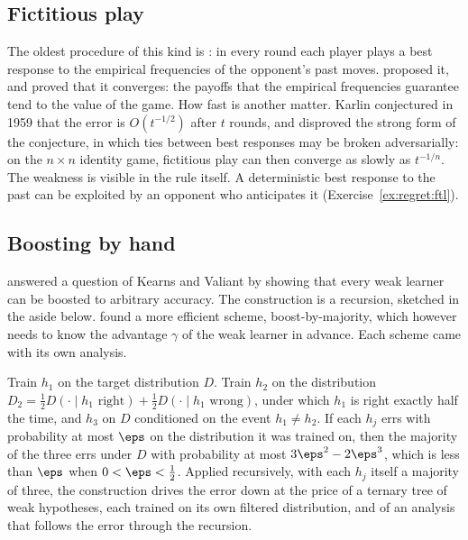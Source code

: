 \begin{refsection}
\subsection{Fictitious play}

The oldest procedure of this kind is : in every round each player plays a best response to the empirical frequencies of the opponent's past moves. \textcite{Brown1951} proposed it, and \textcite{Robinson1951} proved that it converges: the payoffs that the empirical frequencies guarantee tend to the value of the game. How fast is another matter. Karlin conjectured in 1959 that the error is $O(t^{-1/2})$ after $t$ rounds, and \textcite{DaskalakisPan2014} disproved the strong form of the conjecture, in which ties between best responses may be broken adversarially: on the $n\times n$ identity game, fictitious play can then converge as slowly as $t^{-1/n}$. The weakness is visible in the rule itself. A deterministic best response to the past can be exploited by an opponent who anticipates it (Exercise~\ref{ex:regret:ftl}).

\subsection{Boosting by hand}

\textcite{Schapire1990} answered a question of Kearns and Valiant by showing that every weak learner can be boosted to arbitrary accuracy. The construction is a recursion, sketched in the aside below. \textcite{Freund1995} found a more efficient scheme, boost-by-majority, which however needs to know the advantage $\gamma$ of the weak learner in advance. Each scheme came with its own analysis.

\begin{aside}
Train $h_1$ on the target distribution $D$. Train $h_2$ on the distribution $D_2=\frac12D(\cdot\mid h_1\text{ right})+\frac12D(\cdot\mid h_1\text{ wrong})$, under which $h_1$ is right exactly half the time, and $h_3$ on $D$ conditioned on the event $h_1\ne h_2$. If each $h_j$ errs with probability at most $\eps$ on the distribution it was trained on, then the majority of the three errs under $D$ with probability at most $3\eps^2-2\eps^3$, which is less than $\eps$ when $0<\eps<\frac12$. Applied recursively, with each $h_j$ itself a majority of three, the construction drives the error down at the price of a ternary tree of weak hypotheses, each trained on its own filtered distribution, and of an analysis that follows the error through the recursion.
\end{aside}


\end{refsection}
